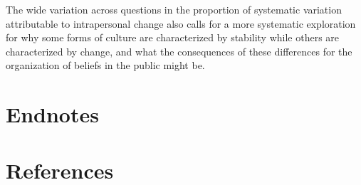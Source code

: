 \documentclass[
  12pt,
]{article}
\begin{document}
The wide variation across questions in the proportion of systematic
variation attributable to intrapersonal change also calls for a more
systematic exploration for why some forms of culture are characterized
by stability while others are characterized by change, and what the
consequences of these differences for the organization of beliefs in the
public might be.

\hypertarget{endnotes}{%
\section{Endnotes}\label{endnotes}}

\hypertarget{references}{%
\section{References}\label{references}}
\end{document}
